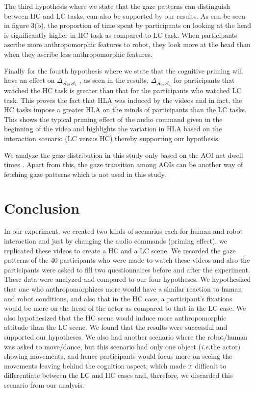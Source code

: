 \documentclass[a4,twocolumn,10pt]{article}
\newcommand{\ie}{{\textit{i.e.\xspace}}}
\newcommand{\deltaant}{{ $\Delta_{\mathcal{A}_0,\mathcal{A}_1}$ }}
\begin{document}
The third hypothesis where we state that the gaze patterns can distinguish
between HC and LC tasks, can also be supported by our results. As can be seen in
figure 3(b), the proportion of time spent by participants on looking at the head
is significantly higher in HC task as compared to LC task. When participants
ascribe more anthropomorphic features to robot, they look more at the head than
when they ascribe less anthropomorphic features.

Finally for the fourth hypothesis where we state that the cognitive priming will
have an effect on \deltaant, as seen in the results, \deltaant
for participants that watched the HC task is greater than that for the
participants who watched LC task. This proves the fact that HLA was induced by
the videos and in fact, the HC tasks impose a greater HLA on the minds of
participants than the LC tasks. This shows the typical priming effect of the
audio command given in the beginning of the video and highlights the variation
in HLA based on the interaction scenario (LC versus HC) thereby supporting our
hypothesis. 

We analyze the gaze distribution in this study only based on the AOI net dwell
times . Apart from this, the gaze transition among AOIs can be another way of
fetching gaze patterns which is not used in this study.

\section{Conclusion}

In our experiment, we created two kinds of scenarios each for human and
robot interaction and just by changing the audio commands (priming
effect), we replicated these videos to create a HC and a LC scene. We recorded
the gaze patterns of the 40 participants who were made to watch these videos and
also the participants were asked to fill two questionnaires before and after the
experiment. These data were analyzed and compared to our four hypotheses. We
hypothesized that one who anthropomorphizes more would have a similar reaction
to human and robot conditions, and also that in the HC case, a
participant's fixations would be more on the head of the actor as compared to
that in the LC case. We also hypothesized that the HC scene would induce more
anthropomorphic attitude than the LC scene. We found that the results were
successful and supported our hypotheses. We also had another scenario where the
robot/human was asked to move/dance, but this scenario had only one object
(\ie the actor) showing movements, and hence participants would focus
more on seeing the movements leaving behind the cognition aspect, which made it
difficult to differentiate between the LC and HC cases and, therefore, we
discarded this scenario from our analysis.





%
%
\end{document}
